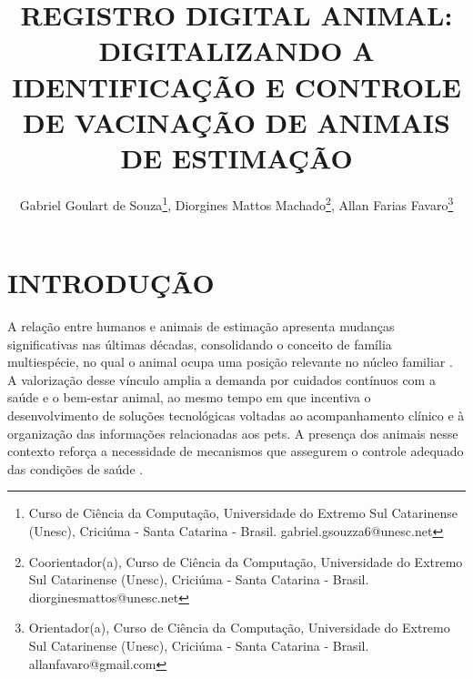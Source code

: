 \documentclass{UNESC}
\title{REGISTRO DIGITAL ANIMAL: DIGITALIZANDO A IDENTIFICAÇÃO E CONTROLE DE VACINAÇÃO DE ANIMAIS DE ESTIMAÇÃO}
\author
{
   Gabriel Goulart de Souza\footnote{Curso de Ciência da Computação, Universidade do Extremo Sul Catarinense (Unesc), Criciúma - Santa Catarina - Brasil. gabriel.gsouzza6@unesc.net},
   Diorgines Mattos Machado\footnote{Coorientador(a), Curso de Ciência da Computação, Universidade do Extremo Sul Catarinense (Unesc), Criciúma - Santa Catarina - Brasil. diorginesmattos@unesc.net},
   Allan Farias Favaro\footnote{Orientador(a), Curso de Ciência da Computação, Universidade do Extremo Sul Catarinense (Unesc), Criciúma - Santa Catarina - Brasil. allanfavaro@gmail.com}
}
\begin{document}
\onehalfspacing

\maketitle

\section{INTRODUÇÃO}

A relação entre humanos e animais de estimação apresenta mudanças significativas nas últimas décadas, consolidando o conceito de família multiespécie, no qual o animal ocupa uma posição relevante no núcleo familiar \cite{BOLSON2022}. A valorização desse vínculo amplia a demanda por cuidados contínuos com a saúde e o bem-estar animal, ao mesmo tempo em que incentiva o desenvolvimento de soluções tecnológicas voltadas ao acompanhamento clínico e à organização das informações relacionadas aos pets. A presença dos animais nesse contexto reforça a necessidade de mecanismos que assegurem o controle adequado das condições de saúde \cite{MORAES2024}.
\end{document}
